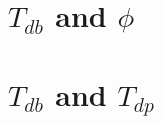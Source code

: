 \documentclass{book}
\begin{document}
\newpage
{
\small



}

\chapter{\(T_{db}\) and \(\phi\) }


\newpage
{
\small



}


\chapter{  \(T_{db}\) and \(T_{dp}\) }

\newpage
{
\small




}






\end{document}
